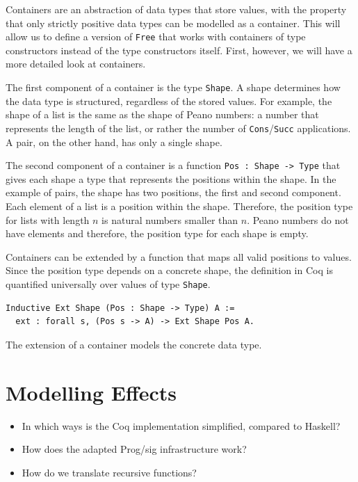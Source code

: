 \documentclass[a4paper, 11pt, fleqn, twoside]{scrreprt}
\newcommand{\hinl}[1]{\texttt{#1}}
\begin{document}
Containers are an abstraction of data types that store values, with the 
property that only strictly positive data types can be modelled as a container. 
This will allow us to define a version of \texttt{Free} that works 
with containers of type constructors instead of the type constructors itself. 
First, however, we will have a more detailed look at containers.

The first component of a container is the type \texttt{Shape}. A 
shape determines how the data type is structured, regardless of the stored 
values. For example, the  shape of a list is the same as the shape of Peano 
numbers: a number that  represents the length of the list, or rather the number 
of \hinl{Cons}/\hinl{Succ} applications. A pair, 
on the other hand, has only a single shape.

The second component of a container is a function \texttt{Pos : Shape 
-> Type} that gives each shape a type that represents the positions within the 
shape. In the example of pairs, the shape has two positions, the first and 
second component. Each element of a list is a position within the shape. 
Therefore, the position type for lists with length $n$ is natural numbers 
smaller than $n$. Peano numbers do not have elements and therefore, the 
position type for each shape is empty.

Containers can be extended by a function that maps all valid positions to 
values. Since the position type depends on a concrete shape, the definition in 
Coq is quantified universally over values of type \texttt{Shape}.

\begin{verbatim}
Inductive Ext Shape (Pos : Shape -> Type) A := 
  ext : forall s, (Pos s -> A) -> Ext Shape Pos A.
\end{verbatim}

The extension of a container models the concrete data type.

\section{Modelling Effects}
\begin{itemize}
\item In which ways is the Coq implementation simplified, compared to Haskell?
\item How does the adapted Prog/sig infrastructure work?
\item How do we translate recursive functions?
\end{itemize}
\end{document}
